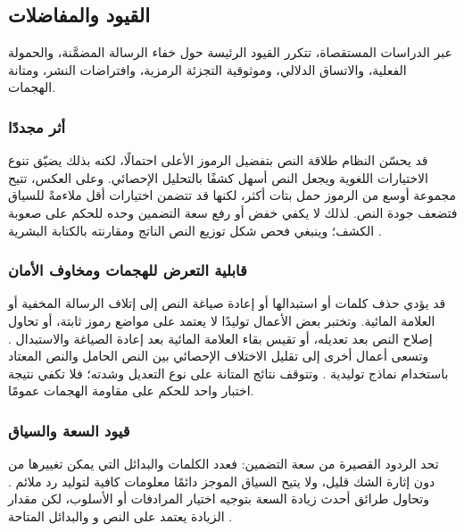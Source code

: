 \subsection{القيود والمفاضلات}
\label{sec:related-rq5}

عبر الدراسات المستقصاة، تتكرر القيود الرئيسة حول خفاء الرسالة المضمَّنة، والحمولة الفعلية، والاتساق الدلالي، وموثوقية التجزئة الرمزية، وافتراضات النشر، ومتانة الهجمات.

\subsubsection{أثر  مجددًا}

قد يحسّن النظام طلاقة النص بتفضيل الرموز الأعلى احتمالًا، لكنه بذلك يضيّق تنوع الاختيارات اللغوية ويجعل النص أسهل كشفًا بالتحليل الإحصائي. وعلى العكس، تتيح مجموعة أوسع من الرموز حمل بتات أكثر، لكنها قد تتضمن اختيارات أقل ملاءمةً للسياق فتضعف جودة النص. لذلك لا يكفي خفض  أو رفع سعة التضمين وحده للحكم على صعوبة الكشف؛ وينبغي فحص شكل توزيع النص الناتج ومقارنته بالكتابة البشرية \cite{yang2020vae}.

\subsubsection{قابلية التعرض للهجمات ومخاوف الأمان}

قد يؤدي حذف كلمات أو استبدالها أو إعادة صياغة النص إلى إتلاف الرسالة المخفية أو العلامة المائية. وتختبر بعض الأعمال توليدًا لا يعتمد على مواضع رموز ثابتة، أو تحاول إصلاح النص بعد تعديله، أو تقيس بقاء العلامة المائية بعد إعادة الصياغة والاستبدال \cite{lin2025positionagnostic,chen2025activetwo,wang2025contrastive}. وتسعى أعمال أخرى إلى تقليل الاختلاف الإحصائي بين النص الحامل والنص المعتاد باستخدام نماذج توليدية \cite{hao2025robust}. وتتوقف نتائج المتانة على نوع التعديل وشدته؛ فلا تكفي نتيجة اختبار واحد للحكم على مقاومة الهجمات عمومًا.

\subsubsection{قيود السعة والسياق}

تحد الردود القصيرة من سعة التضمين: فعدد الكلمات والبدائل التي يمكن تغييرها من دون إثارة الشك قليل، ولا يتيح السياق الموجز دائمًا معلومات كافية لتوليد رد ملائم \cite{liao2024co,ding2023context}. وتحاول طرائق أحدث زيادة السعة بتوجيه اختيار المرادفات أو الأسلوب، لكن مقدار الزيادة يعتمد على النص و والبدائل المتاحة \cite{kuznetsov2025deepstego,wozniak2025multicriteria}.

